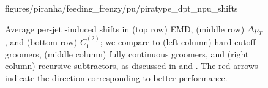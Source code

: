 \begin{subappendices}
\begin{figure}[p]
{        {figures/piranha/feeding_frenzy/pu/piratype_dpt_npu_shifts}
    }
    \\
    \caption[Average per-jet -induced shifts in the EMD, \(\Delta p_T\), and \(C_1^{(2)}\).]{
    Average per-jet -induced shifts in (top row) EMD, (middle row) \(\Delta p_T\), and (bottom row) \(C_1^{(2)}\);
    we compare  to (left column) hard-cutoff groomers, (middle column) fully continuous groomers, and (right column) recursive subtractors, as discussed in  and .
    The red arrows indicate the direction corresponding to better performance.
}
\label{fig:pufrenzy_ave}
\end{figure}



\end{subappendices}
